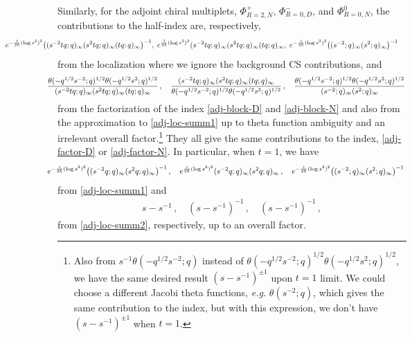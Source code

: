 \documentclass[11pt,hyper,a4paper]{article}
\begin{document}
Similarly, for the adjoint chiral multiplets, $\Phi^{+}_{R=2, N}$, $\Phi^{-}_{R=0,D}$, and $\Phi^{0}_{R=0,N}$, the contributions to the half-index are, respectively, 
\begin{align}
\begin{split}
\hspace{-25mm}
e^{ -\frac{1}{2\hbar} (\log s^2)^2 } \big( (s^{-2} t q ;q)_\infty (s^{2} t q ;q)_\infty ( t q ;q)_\infty \big)^{-1}	,	\hspace{1mm} 	
e^{ \frac{1}{2\hbar} (\log s^2)^2 } (s^{-2} t q;q)_\infty (s^{2} t q;q)_\infty ( t q ;q)_\infty	,	\hspace{1mm}
e^{ -\frac{1}{2\hbar} (\log s^2)^2 } \big( (s^{-2} ;q)_\infty (s^{2} ;q)_\infty \big)^{-1}	\quad\label{adj-loc-summ1}
\end{split}
\end{align}
from the localization where we ignore the background CS contributions,
and 
\begin{align}
\hspace{-5mm}
\frac{\theta(-q^{1/2} s^{-2};q)^{1/2} \theta(-q^{1/2} s^{2};q)^{1/2}}{(s^{-2} t q ;q)_\infty (s^{2} t q ;q)_\infty ( t q;q)_\infty}	\,	,	\quad	
\frac{(s^{-2} t q;q)_\infty (s^{2} t q;q)_\infty ( t q;q)_\infty}{\theta(-q^{1/2} s^{-2};q)^{1/2} \theta(-q^{1/2} s^{2};q)^{1/2}}	\,	,	\quad	
\frac{\theta(-q^{1/2} s^{-2};q)^{1/2} \theta(-q^{1/2} s^{2};q)^{1/2}}{(s^{-2} ;q)_\infty (s^{2} ;q)_\infty}	\label{adj-loc-summ2}
\end{align}
from the factorization of the index \eqref{adj-block-D} and \eqref{adj-block-N} and also from the approximation to \eqref{adj-loc-summ1} up to theta function ambiguity and an irrelevant overall factor.\footnote{
Also from $s^{-1} \theta(-q^{1/2} s^{-2};q)$ instead of $\theta(-q^{1/2} s^{-2};q)^{1/2} \theta(-q^{1/2} s^{2};q)^{1/2}$, we have the same desired result $(s-s^{-1})^{\pm1}$ upon $t=1$ limit.
We could choose a different Jacobi theta functions, \textit{e.g.} $\theta(s^{-2};q)$, which gives the same contribution to the index, but with this expression, we don't have $(s-s^{-1})^{\pm1}$ when $t=1$.
}
They all give the same contributions to the index, \eqref{adj-factor-D} or \eqref{adj-factor-N}.
In particular, when $t=1$, we have
\begin{align}
\hspace{-5mm}
e^{-\frac{1}{2\hbar} (\log s^2)^2 } \big( (s^{-2} q ;q)_\infty (s^{2} q ;q)_\infty \big)^{-1}	\,	,	\quad 	
e^{\frac{1}{2\hbar} (\log s^2)^2 } (s^{-2} q;q)_\infty (s^{2} q;q)_\infty	\,	,	\quad	
e^{-\frac{1}{2\hbar} (\log s^2)^2 } \big( (s^{-2} ;q)_\infty (s^{2} ;q)_\infty \big)^{-1}	\,	\label{adj-loc-summ-unref1}
\end{align}
from \eqref{adj-loc-summ1} and
\begin{align}
s-s^{-1}	\,	,	\quad	
(s-s^{-1})^{-1}	\,	,	\quad	
(s-s^{-1})^{-1}	\,	,	\label{adj-loc-summ-unref2}
\end{align}
from \eqref{adj-loc-summ2}, respectively, up to an overall factor. 
\end{document}
